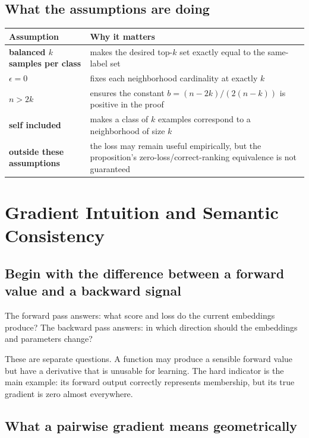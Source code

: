 \documentclass[11pt,oneside,openany]{book}
\theoremstyle{myplain}
\theoremstyle{definition}
\begin{document}
\section{What the assumptions are doing}

\begin{center}
\small
\begin{tabularx}{\textwidth}{>{\bfseries}p{} X}
\toprule
Assumption & Why it matters \\
\midrule
balanced $k$ samples per class & makes the desired top-$k$ set exactly equal to the same-label set \\
$\epsilon=0$ & fixes each neighborhood cardinality at exactly $k$ \\
$n>2k$ & ensures the constant $b=(n-2k)/(2(n-k))$ is positive in the proof \\
self included & makes a class of $k$ examples correspond to a neighborhood of size $k$ \\
outside these assumptions & the loss may remain useful empirically, but the proposition's zero-loss/correct-ranking equivalence is not guaranteed \\
\bottomrule
\end{tabularx}
\end{center}

\chapter{Gradient Intuition and Semantic Consistency}
\label{chap:gradients}

\section{Begin with the difference between a forward value and a backward signal}

The forward pass answers: what score and loss do the current embeddings produce? The backward pass answers: in which direction should the embeddings and parameters change?

These are separate questions. A function may produce a sensible forward value but have a derivative that is unusable for learning. The hard indicator is the main example: its forward output correctly represents membership, but its true gradient is zero almost everywhere.

\section{What a pairwise gradient means geometrically}
\end{document}
